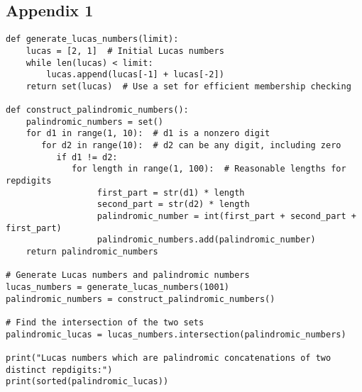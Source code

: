 \subsection*{Appendix 1}\label{app1}
\begin{verbatim}
def generate_lucas_numbers(limit):
    lucas = [2, 1]  # Initial Lucas numbers
    while len(lucas) < limit:
        lucas.append(lucas[-1] + lucas[-2])
    return set(lucas)  # Use a set for efficient membership checking

def construct_palindromic_numbers():
    palindromic_numbers = set()
    for d1 in range(1, 10):  # d1 is a nonzero digit
       for d2 in range(10):  # d2 can be any digit, including zero
          if d1 != d2:
             for length in range(1, 100):  # Reasonable lengths for repdigits
                  first_part = str(d1) * length
                  second_part = str(d2) * length
                  palindromic_number = int(first_part + second_part + first_part)
                  palindromic_numbers.add(palindromic_number)
    return palindromic_numbers

# Generate Lucas numbers and palindromic numbers
lucas_numbers = generate_lucas_numbers(1001)
palindromic_numbers = construct_palindromic_numbers()

# Find the intersection of the two sets
palindromic_lucas = lucas_numbers.intersection(palindromic_numbers)

print("Lucas numbers which are palindromic concatenations of two distinct repdigits:")
print(sorted(palindromic_lucas))

\end{verbatim}
